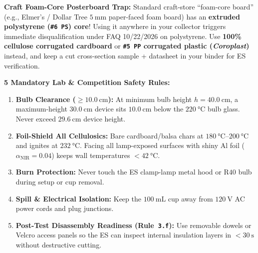\begin{twocol}[0.52]
\begin{tabularx}{\linewidth}{@{}c>{\raggedright\arraybackslash}p{0.25\linewidth}rrl>{\raggedright\arraybackslash}X@{}}
\end{tabularx}
\nextcol[0.46]
\begin{devicebox}
\textbf{Craft Foam-Core Posterboard Trap:} Standard craft-store ``foam-core board'' (e.g., Elmer's / Dollar Tree $\SI{5}{\milli\meter}$ paper-faced foam board) has an \textbf{extruded polystyrene (\texttt{\#6~PS}) core}! Using it anywhere in your collector triggers immediate disqualification under FAQ 10/22/2026 on polystyrene. Use \textbf{100\% cellulose corrugated cardboard} or \textbf{\texttt{\#5~PP} corrugated plastic (\textit{Coroplast})} instead, and keep a cut cross-section sample + datasheet in your binder for ES verification.

\smallskip
\textbf{5 Mandatory Lab \& Competition Safety Rules:}
\begin{enumerate}
  \item \textbf{Bulb Clearance ($\ge\SI{10.0}{\centi\meter}$):} At minimum bulb height $h = \SI{40.0}{\centi\meter}$, a maximum-height $\SI{30.0}{\centi\meter}$ device sits $\SI{10.0}{\centi\meter}$ below the $\SI{220}{\celsius}$ bulb glass. Never exceed $\SI{29.6}{\centi\meter}$ device height.
  \item \textbf{Foil-Shield All Cellulosics:} Bare cardboard/balsa chars at $\SIrange{180}{200}{\celsius}$ and ignites at $\SI{232}{\celsius}$. Facing all lamp-exposed surfaces with shiny Al foil ($\alpha_{\mathrm{NIR}}=0.04$) keeps wall temperatures $< \SI{42}{\celsius}$.
  \item \textbf{Burn Protection:} Never touch the ES clamp-lamp metal hood or $\mathrm{R40}$ bulb during setup or cup removal.
  \item \textbf{Spill \& Electrical Isolation:} Keep the $\SI{100}{\milli\liter}$ cup away from $\SI{120}{\volt}$ AC power cords and plug junctions.
  \item \textbf{Post-Test Disassembly Readiness (Rule~\texttt{3.f}):} Use removable dowels or Velcro access panels so the ES can inspect internal insulation layers in $<\SI{30}{\second}$ without destructive cutting.
\end{enumerate}
\end{devicebox}
\end{twocol}

